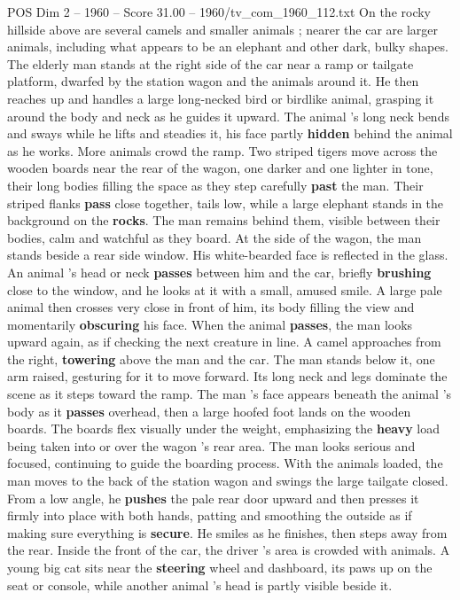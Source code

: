 \begin{textsample}{POS Dim 2 – 1960 – Score 31.00 – 1960/tv\_com\_1960\_112.txt}
On the rocky hillside above are several camels and smaller animals ; nearer the car are larger animals, including what appears to be an elephant and other dark, bulky shapes.
The elderly man stands at the right side of the car near a ramp or tailgate platform, dwarfed by the station wagon and the animals around it.
He then reaches up and handles a large long-necked bird or birdlike animal, grasping it around the body and neck as he guides it upward.
The animal ’s long neck bends and sways while he lifts and steadies it, his face partly \textbf{hidden} behind the animal as he works.
More animals crowd the ramp.
Two striped tigers move across the wooden boards near the rear of the wagon, one darker and one lighter in tone, their long bodies filling the space as they step carefully \textbf{past} the man.
Their striped flanks \textbf{pass} close together, tails low, while a large elephant stands in the background on the \textbf{rocks}.
The man remains behind them, visible between their bodies, calm and watchful as they board.
At the side of the wagon, the man stands beside a rear side window.
His white-bearded face is reflected in the glass.
An animal ’s head or neck \textbf{passes} between him and the car, briefly \textbf{brushing} close to the window, and he looks at it with a small, amused smile.
A large pale animal then crosses very close in front of him, its body filling the view and momentarily \textbf{obscuring} his face.
When the animal \textbf{passes}, the man looks upward again, as if checking the next creature in line.
A camel approaches from the right, \textbf{towering} above the man and the car.
The man stands below it, one arm raised, gesturing for it to move forward.
Its long neck and legs dominate the scene as it steps toward the ramp.
The man ’s face appears beneath the animal ’s body as it \textbf{passes} overhead, then a large hoofed foot lands on the wooden boards.
The boards flex visually under the weight, emphasizing the \textbf{heavy} load being taken into or over the wagon ’s rear area.
The man looks serious and focused, continuing to guide the boarding process.
With the animals loaded, the man moves to the back of the station wagon and swings the large tailgate closed.
From a low angle, he \textbf{pushes} the pale rear door upward and then presses it firmly into place with both hands, patting and smoothing the outside as if making sure everything is \textbf{secure}.
He smiles as he finishes, then steps away from the rear.
Inside the front of the car, the driver ’s area is crowded with animals.
A young big cat sits near the \textbf{steering} wheel and dashboard, its paws up on the seat or console, while another animal ’s head is partly visible beside it.

\end{textsample}
